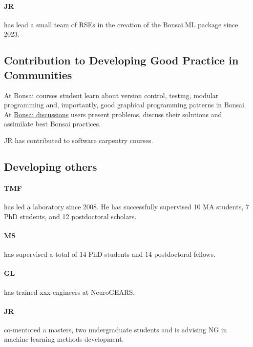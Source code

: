 \paragraph{JR} has lead a small team of RSEs in the
creation of the Bonsai.ML package since 2023.

\subsection*{Contribution to Developing Good Practice in Communities}

At Bonsai courses student learn about version control, testing, modular
programming and, importantly, good graphical programming patterns in Bonsai.
%
At \href{https://github.com/orgs/bonsai-rx/discussions}{Bonsai discussions}
users present problems, discuss their solutions and assimilate best
Bonsai practices.

JR has contributed to software carpentry courses.


\subsection*{Developing others}

\paragraph{TMF} has led a laboratory since 2008. He has
successfully supervised 10 MA students, 7 PhD students, and 12 postdoctoral
scholars.

\paragraph{MS} has supervised a total of 14 PhD students and
14 postdoctoral fellows.

\paragraph{GL} has trained xxx engineers at NeuroGEARS.

\paragraph{JR} co-mentored a masters, two undergraduate
students and is advising NG in machine learning methods development.
